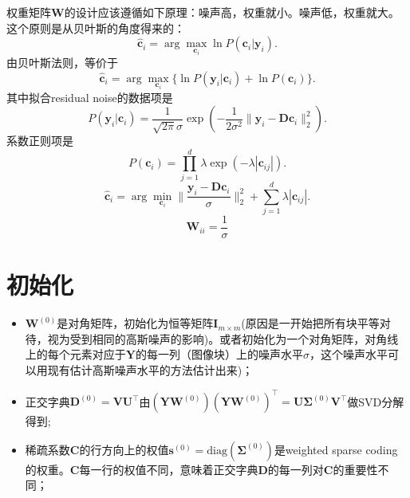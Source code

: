 \documentclass[10pt,twocolumn,letterpaper]{article}
\begin{document}
权重矩阵$\mathbf{W}$的设计应该遵循如下原理：噪声高，权重就小。噪声低，权重就大。这个原则是从贝叶斯的角度得来的：
\begin{equation}
\hat{\mathbf{c}}_{i} = \arg\max_{\mathbf{c}_{i}}\ln P(\mathbf{c}_{i}|\mathbf{y}_{i}).
\end{equation}
由贝叶斯法则，等价于
\begin{equation}
\hat{\mathbf{c}}_{i} = \arg\max_{\mathbf{c}_{i}}\{\ln P(\mathbf{y}_{i}|\mathbf{c}_{i})+\ln P(\mathbf{c}_{i})\}.
\end{equation}
其中拟合residual noise的数据项是
\begin{equation}
P(\mathbf{y}_{i}|\mathbf{c}_{i}) = \frac{1}{\sqrt{2\pi}\sigma}\exp(-\frac{1}{2\sigma^{2}}\|\mathbf{y}_{i}-\mathbf{D}\mathbf{c}_{i}\|_{2}^{2}).
\end{equation}
系数正则项是
\begin{equation}
P(\mathbf{c}_{i})=\prod_{j=1}^{d}\lambda\exp(-\lambda|\mathbf{c}_{ij}|).
\end{equation}
\begin{equation}
\hat{\mathbf{c}}_{i}=\arg\min_{\mathbf{c}_{i}}\|\frac{\mathbf{y}_{i}-\mathbf{D}\mathbf{c}_{i}}{\sigma}\|_{2}^{2}+\sum_{j=1}^{d}{\lambda}{|\mathbf{c}_{ij}|}.
\end{equation}
\begin{equation}
\mathbf{W}_{ii} = \frac{1}{\sigma}
\end{equation}

\section{初始化}
\begin{itemize}
\item $\mathbf{W}^{(0)}$是对角矩阵，初始化为恒等矩阵$\mathbf{I}_{m\times m}$(原因是一开始把所有块平等对待，视为受到相同的高斯噪声的影响)。或者初始化为一个对角矩阵，对角线上的每个元素对应于$\mathbf{Y}$的每一列（图像块）上的噪声水平$\sigma$，这个噪声水平可以用现有估计高斯噪声水平的方法估计出来)；
\item 正交字典$\mathbf{D}^{(0)}=\mathbf{V}\mathbf{U}^{\top}$由$(\mathbf{Y}\mathbf{W}^{(0)})(\mathbf{Y}\mathbf{W}^{(0)})^{\top}=\mathbf{U}\mathbf{\Sigma}^{(0)}\mathbf{V}^{\top}$做SVD分解得到;
\item 稀疏系数$\mathbf{C}$的行方向上的权值$\mathbf{s}^{(0)}=\text{diag}(\mathbf{\Sigma}^{(0)})$是weighted sparse coding的权重。$\mathbf{C}$每一行的权值不同，意味着正交字典$\mathbf{D}$的每一列对$\mathbf{C}$的重要性不同；
\end{itemize}
\end{document}
